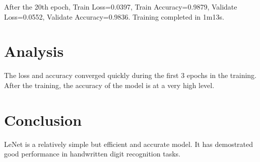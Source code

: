 \documentclass{article}
\begin{document}
After the 20th epoch,
Train Loss=0.0397, Train Accuracy=0.9879, Validate Loss=0.0552, Validate Accuracy=0.9836.
Training completed in 1m13s.

\section{Analysis}
The loss and accuracy converged quickly during the first 3 epochs in the training.
After the training, the accuracy of the model is at a very high level.

\section{Conclusion}

LeNet is a relatively simple but efficient and accurate model.
It has demostrated good performance in handwritten digit recognition tasks. 

\newpage


\end{document}
